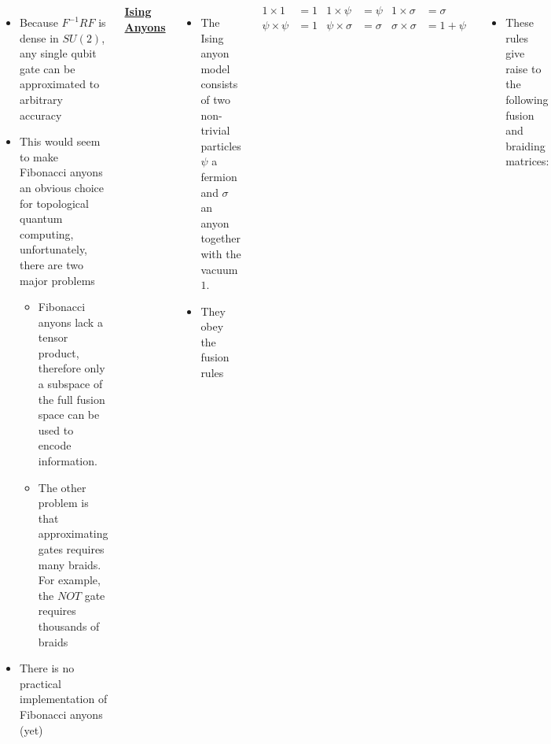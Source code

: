 \documentclass[20pt,,margin=1in,innermargin=-4.5in,blockverticalspace=-0.25in]{tikzposter}
\begin{document}
\begin{columns}
{\begin{align*}
        \end{align*}
        \begin{itemize}
            \item Because $F^{-1}RF$ is dense in $SU(2)$, any single qubit gate can be approximated to arbitrary accuracy
            \item This would seem to make Fibonacci anyons an obvious choice for topological quantum computing, unfortunately, there are two major problems
            \begin{itemize}
                \item Fibonacci anyons lack a tensor product, therefore only a subspace of the full fusion space can be used to encode information.
                \item The other problem is that approximating gates requires many braids. For example, the $NOT$ gate requires thousands of braids
            \end{itemize}
            \item There is no practical implementation of Fibonacci anyons (yet)
        \end{itemize}
        \begin{center}
            \textbf{\underline{Ising Anyons} \cite{cite:1}}
        \end{center}
        \begin{itemize}
            \item The Ising anyon model consists of two non-trivial particles $\psi$ a fermion and $\sigma$ an anyon together with the vacuum $1$.
            \item They obey the fusion rules
        \end{itemize}
        \begin{align*}
            1\times1&=1 & 1\times\psi&=\psi & 1\times\sigma&=\sigma\\
            \psi\times\psi&=1 & \psi\times\sigma&=\sigma & \sigma\times\sigma&=1+\psi
        \end{align*}
        \begin{itemize}
            \item These rules give raise to the following fusion and braiding matrices:
        \end{itemize}
        \begin{align*}
            F&=\frac{1}{\sqrt{2}}
            \begin{pmatrix}
                1&1\\1&-1
            \end{pmatrix} & R&=e^{-i\frac{\pi}{8}}

\end{align*}}
\end{columns}
\end{document}
